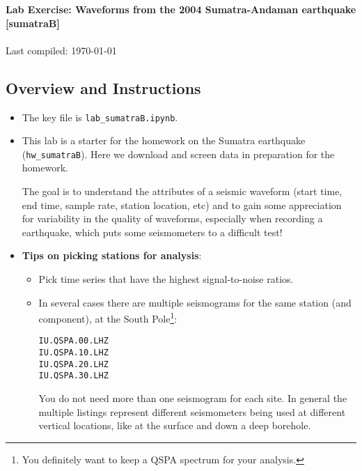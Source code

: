 \documentclass[11pt,titlepage,fleqn]{article}
\newcommand{\tfile}{{\tt lab\_sumatraB.ipynb}}
\begin{document}

\begin{spacing}{1.2} 
\centering
{\large \bf Lab Exercise: Waveforms from the 2004 Sumatra-Andaman earthquake [sumatraB]} \\
\cltag\ \\
Last compiled: \today
\end{spacing}

\subsection*{Overview and Instructions}

\begin{itemize}
\item The key file is \tfile.

\item This lab is a starter for the homework on the Sumatra earthquake (\verb+hw_sumatraB+). Here we download and screen data in preparation for the homework.

The goal is to understand the attributes of a seismic waveform (start time, end time, sample rate, station location, etc) and to gain some appreciation for variability in the quality of waveforms, especially when recording a  earthquake, which puts some seismometers to a difficult test!


\item {\bf Tips on picking stations for analysis}:
\begin{itemize}
\item Pick time series that have the highest signal-to-noise ratios.
\item In several cases there are multiple seismograms for the same station (and component), \eg at the South Pole\footnote{You definitely want to keep a QSPA spectrum for your analysis.}:
%
\begin{spacing}{1.0}
\begin{verbatim}
IU.QSPA.00.LHZ
IU.QSPA.10.LHZ
IU.QSPA.20.LHZ
IU.QSPA.30.LHZ
\end{verbatim}
\end{spacing}
%
You do not need more than one seismogram for each site. In general the multiple listings represent different seismometers being used at different vertical locations, like at the surface and down a deep borehole.


\end{itemize}
\end{itemize}
\end{document}

